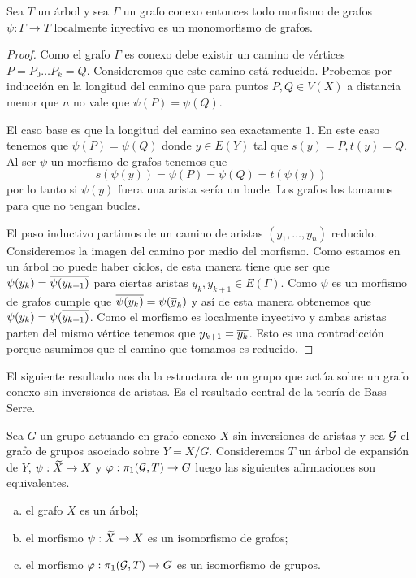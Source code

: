 \documentclass[tesis.tex]{subfiles}
\begin{document}
\begin{prop}\label{prop_loc_iny}
	Sea $T$ un árbol y sea $\Gamma$ un grafo conexo entonces todo morfismo de grafos $\psi:\Gamma \to T$ localmente inyectivo es un monomorfismo de grafos.    
\end{prop}
\begin{proof}
	Como el grafo $\Gamma$ es conexo debe existir un camino de vértices $P=P_0 \dots P_k=Q$.
	Consideremos que este camino está reducido.
	Probemos por inducción en la longitud del camino que para puntos $P,Q \in V(X)$ a distancia menor que $n$ no vale que $\psi(P) = \psi(Q)$.
	
	El caso base es que la longitud del camino sea exactamente $1$.
	En este caso tenemos que $\psi(P) = \psi(Q)$ donde $y \in E(Y)$ tal que $s(y)= P, t(y) = Q$.
	Al ser $\psi$ un morfismo de grafos tenemos que 
	\begin{equation*}
		s(\psi(y)) = \psi(P) = \psi (Q) = t(\psi(y))
	\end{equation*}
	por lo tanto si $\psi(y)$ fuera una arista sería un bucle.
	Los grafos los tomamos para que no tengan bucles.
	
	El paso inductivo partimos de un camino de aristas $(y_1, \dots, y_n)$ reducido.
	Consideremos la imagen del camino por medio del morfismo.
	Como estamos en un árbol no puede haber ciclos, de esta manera tiene que ser que $\psi(y_k) = \overline{\psi (y_{k+1})}$ para ciertas aristas $y_k, y_{k+1} \in E(\Gamma)$.
	Como $\psi$ es un morfismo de grafos cumple que $\overline {\psi(y_k)} = \psi(\overline y_k)$ y así de esta manera obtenemos que $\psi(y_k) =  \psi(\overline{y_{k+1})}$.
	Como el morfismo es localmente inyectivo y ambas aristas parten del mismo vértice tenemos que $y_{k+1} = \overline{y_k}$. Esto es una contradicción porque asumimos que el camino que tomamos es reducido.    
\end{proof}

El siguiente resultado nos da la estructura de un grupo que actúa sobre un grafo conexo sin inversiones de aristas. 
Es el resultado central de la teoría de Bass Serre.

\begin{teo}\label{teo_Serre}
	Sea $G$ un grupo actuando en grafo conexo $X$ sin inversiones de aristas y sea $\cal G$ el grafo de grupos asociado sobre $Y = X / G$.
	Consideremos $T$ un árbol de expansión de $Y$, $\psi: \widetilde X \to X$ y $\varphi: \pi_1({\cal G}, T) \to G$ luego las siguientes afirmaciones son equivalentes.
	\begin{enumerate}[(a)]
		\item el grafo $X$ es un árbol;
		\item el morfismo $\psi: \widetilde X \to X$ es un isomorfismo de grafos;
		\item el morfismo $\varphi:\pi_1({\cal G}, T) \to G$ es un isomorfismo de grupos.
	\end{enumerate}
\end{teo}
\end{document}
